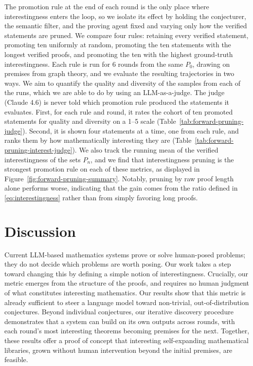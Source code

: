 The promotion rule at the end of each round is the only place where interestingness enters the loop, so we isolate its effect by holding the conjecturer, the semantic filter, and the proving agent fixed and varying only how the verified statements are pruned.
%
We compare four rules: retaining every verified statement, promoting ten uniformly at random, promoting the ten statements with the longest verified proofs, and promoting the ten with the highest ground-truth interestingness.
%
Each rule is run for 6 rounds from the same $P_0$, drawing on premises from graph theory, and we evaluate the resulting trajectories in two ways.
%
We aim to quantify the quality and diversity of the samples from each of the runs, which we are able to do by using an LLM-as-a-judge. 
%
The judge (Claude 4.6) is never told which promotion rule produced the statements it evaluates.
%
First, for each rule and round, it rates the cohort of ten promoted statements for quality and diversity on a 1--5 scale (Table~\ref{tab:forward-pruning-judge}).
%
Second, it is shown four statements at a time, one from each rule, and ranks them by how mathematically interesting they are (Table~\ref{tab:forward-pruning-interest-judge}).
%
We also track the running mean of the verified interestingness of the sets $P_n$, and we find that interestingness pruning is the strongest promotion rule on each of these metrics, as displayed in Figure~\ref{fig:forward-pruning-summary}.
%
Notably, pruning by raw proof length alone performs worse, indicating that the gain comes from the ratio defined in \eqref{eq:interestingness} rather than from simply favoring long proofs.

\section{Discussion}
\label{sec:discussion}

\label{sec:limitations}
%
Current LLM-based mathematics systems prove or solve human-posed problems; they do not decide which problems are worth posing.
%
Our work takes a step toward changing this by defining a simple notion of interestingness.
%
Crucially, our metric emerges from the structure of the proofs, and requires no human judgment of what constitutes interesting mathematics.
%
Our results show that this metric is already sufficient to steer a language model toward non-trivial, out-of-distribution conjectures.
%
Beyond individual conjectures, our iterative discovery procedure demonstrates that a system can build on its own outputs across rounds, with each round's most interesting theorems becoming premises for the next.
%
Together, these results offer a proof of concept that interesting self-expanding mathematical libraries, grown without human intervention beyond the initial premises, are feasible.


